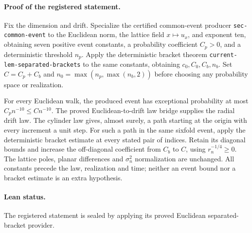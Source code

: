 \paragraph{Proof of the registered statement.}
Fix the dimension and drift. Specialize the certified common-event producer
\texttt{sec-common-event} to the Euclidean norm, the lattice field
$x\mapsto u_x$, and exponent ten, obtaining seven positive event constants,
a probability coefficient $C_p>0$, and a deterministic threshold $n_p$.
Apply the deterministic bracket theorem \texttt{current-lem-separated-brackets}
to the same constants, obtaining $c_0,C_0,C_b,n_b$.
Set $C=C_p+C_b$ and $n_0=\max(n_p,\max(n_b,2))$ before choosing any
probability space or realization.

For every Euclidean walk, the produced event has exceptional probability
at most $C_p n^{-10}\leq Cn^{-10}$. The proved Euclidean-to-drift law
bridge supplies the radial drift law. The cylinder law gives, almost surely,
a path starting at the origin with every increment a unit step.
For such a path in the same sixfold event, apply the deterministic bracket
estimate at every stated pair of indices. Retain its diagonal bounds and
increase the off-diagonal coefficient from $C_b$ to $C$, using
$r_n^{-1/4}\geq0$. The lattice poles, planar differences and $\sigma_n^2$
normalization are unchanged. All constants precede the law, realization and
time; neither an event bound nor a bracket estimate is an extra hypothesis.
\paragraph{Lean status.}
The registered statement is sealed by applying its proved Euclidean separated-bracket provider.
